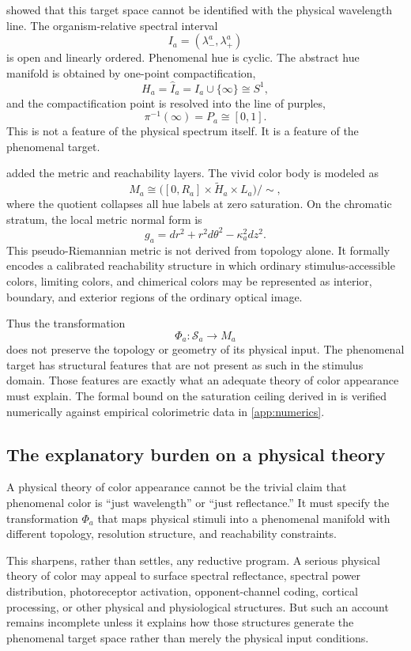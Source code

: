 \documentclass[preprint,12pt,authoryear]{elsarticle}
\theoremstyle{plain}
\theoremstyle{definition}
\theoremstyle{remark}
\begin{document}
 showed that this target space cannot be identified with the physical wavelength line. The organism-relative spectral interval
\[
I_a=(\lambda_-^a,\lambda_+^a)
\]
is open and linearly ordered. Phenomenal hue is cyclic. The abstract hue manifold is obtained by one-point compactification,
\[
H_a=\widehat I_a=I_a\cup\{\infty\}\cong S^1,
\]
and the compactification point is resolved into the line of purples,
\[
\pi^{-1}(\infty)=P_a\cong[0,1].
\]
This is not a feature of the physical spectrum itself. It is a feature of the phenomenal target.

 added the metric and reachability layers. The vivid color body is modeled as
\[
M_a\cong\bigl([0,R_a]\times\widetilde H_a\times L_a\bigr)/{\sim},
\]
where the quotient collapses all hue labels at zero saturation. On the chromatic stratum, the local metric normal form is
\[
g_a=dr^2+r^2d\theta^2-\kappa_a^2dz^2.
\]
This pseudo-Riemannian metric is not derived from topology alone. It formally encodes a calibrated reachability structure in which ordinary stimulus-accessible colors, limiting colors, and chimerical colors may be represented as interior, boundary, and exterior regions of the ordinary optical image.

Thus the transformation
\[
\Phi_a:\mathcal{S}_a\to M_a
\]
does not preserve the topology or geometry of its physical input. The phenomenal target has structural features that are not present as such in the stimulus domain. Those features are exactly what an adequate theory of color appearance must explain. The formal bound on the saturation ceiling derived in  is verified numerically against empirical colorimetric data in \ref{app:numerics}.

\subsection{The explanatory burden on a physical theory}
\label{subsec:explanatory-burden}

\noindent A physical theory of color appearance cannot be the trivial claim that phenomenal color is ``just wavelength'' or ``just reflectance.'' It must specify the transformation $\Phi_a$ that maps physical stimuli into a phenomenal manifold with different topology, resolution structure, and reachability constraints.

This sharpens, rather than settles, any reductive program. A serious physical theory of color may appeal to surface spectral reflectance, spectral power distribution, photoreceptor activation, opponent-channel coding, cortical processing, or other physical and physiological structures. But such an account remains incomplete unless it explains how those structures generate the phenomenal target space rather than merely the physical input conditions.
\end{document}

